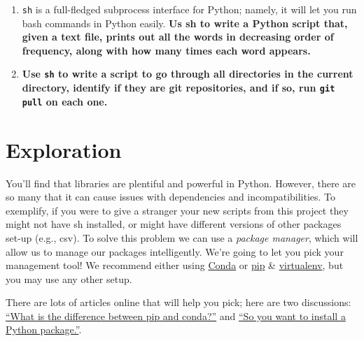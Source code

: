 \documentclass{article}
\begin{document}
\begin{enumerate} 
  \item \texttt{sh} is a full-fledged subprocess interface for Python; namely, it will let you run bash commands in Python easily. \textbf{Us sh to write a Python script that, given a text file, prints out all the words in decreasing order of frequency, along with how many times each word appears.}
  \vspace{5cm}

  \item \textbf{Use \texttt{sh} to write a script to go through all directories in the current directory, identify if they are git repositories, and if so, run \texttt{git pull} on each one.}
  \vspace{5cm}

\end{enumerate} 

\newpage
\section{Exploration}
You'll find that libraries are plentiful and powerful in Python. However, there are so many that it can cause issues with dependencies and incompatibilities. To exemplify, if you were to give a stranger your new scripts from this project they might not have sh installed, or might have different versions of other packages set-up (e.g., csv). To solve this problem we can use a \textit{package manager}, which will allow us to manage our packages intelligently. We're going to let you pick your management tool! We recommend either using \href{https://www.continuum.io/downloads}{Conda} or \href{https://pip.pypa.io/en/stable/}{pip} \& \href{https://virtualenv.pypa.io/en/latest/}{virtualenv}, but you may use any other setup.

There are lots of articles online that will help you pick; here are two discussions: \href{http://stackoverflow.com/questions/20994716/what-is-the-difference-between-pip-and-conda}{``What is the difference between pip and conda?''} and \href{http://dubroy.com/blog/so-you-want-to-install-a-python-package/}{``So you want to install a Python package.''}.
\end{document}
